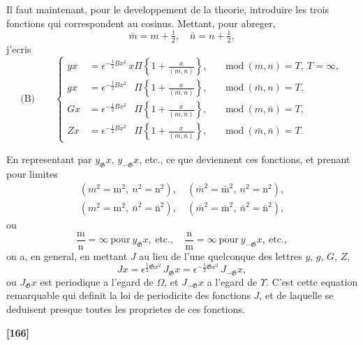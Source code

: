 \documentclass[11pt,a4paper]{book}
\providecommand{\modd}{\ \mathrm{mod}\ }
\begin{document}
Il faut maintenant, pour le developpement de la theorie, introduire les trois fonctions
qui correspondent au cosinus. Mettant, pour abreger,
\begin{equation}
\bar{m} = m + \tfrac{1}{2},\quad \bar{n} = n + \tfrac{1}{2}, \tag{20}
\end{equation}
j'ecris
\begin{equation*}
\text{(B)}\qquad
\left\{
\begin{aligned}
yx &= \epsilon^{-\frac{1}{2}Bx^2}\, x\Pi \left\{1 + \frac{x}{(m, n)}\right\}, && \modd(m, n) = T,\ T = \infty,\\
gx &= \epsilon^{-\frac{1}{2}Bx^2}\, \phantom{x}\Pi \left\{1 + \frac{x}{(\bar{m}, n)}\right\}, && \modd(\bar{m}, n) = T,\\
Gx &= \epsilon^{-\frac{1}{2}Bx^2}\, \phantom{x}\Pi \left\{1 + \frac{x}{(m, \bar{n})}\right\}, && \modd(m, \bar{n}) = T,\\
Zx &= \epsilon^{-\frac{1}{2}Bx^2}\, \phantom{x}\Pi \left\{1 + \frac{x}{(\bar{m}, \bar{n})}\right\}, && \modd(\bar{m}, \bar{n}) = T.
\end{aligned}
\right.
\end{equation*}

En representant par $y_{\mathfrak{G}}x$, $y_{-\mathfrak{G}}x$, etc., ce que deviennent ces fonctions, et prenant pour
limites
\begin{gather*}
(m^2 = \mathrm{m}^2,\ n^2 = \mathrm{n}^2),\quad (\bar{m}^2 = \bar{\mathrm{m}}^2,\ n^2 = \mathrm{n}^2),\\
(m^2 = \mathrm{m}^2,\ \bar{n}^2 = \bar{\mathrm{n}}^2),\quad (\bar{m}^2 = \bar{\mathrm{m}}^2,\ \bar{n}^2 = \bar{\mathrm{n}}^2),
\end{gather*}
ou
\[\frac{\mathrm{m}}{\mathrm{n}} = \infty\ \text{pour}\ y_{\mathfrak{G}}x,\ \text{etc.},\quad \frac{\mathrm{n}}{\mathrm{m}} = \infty\ \text{pour}\ y_{-\mathfrak{G}}x,\ \text{etc.},\]
on a, en general, en mettant $J$ au lieu de l'une quelconque des lettres $y$, $g$, $G$, $Z$,
\begin{equation}
Jx = \epsilon^{\frac{1}{2}\mathfrak{G}x^2}\, J_{\mathfrak{G}}x = \epsilon^{-\frac{1}{2}\mathfrak{G}x^2}\, J_{-\mathfrak{G}}x, \tag{21}
\end{equation}
ou $J_{\mathfrak{G}}x$ est periodique a l'egard de $\Omega$, et $J_{-\mathfrak{G}}x$ a l'egard de $\Upsilon$. C'est cette equation
remarquable qui definit la loi de periodicite des fonctions $J$, et de laquelle se deduisent
presque toutes les proprietes de ces fonctions.

\textbf{[166]}
\end{document}
